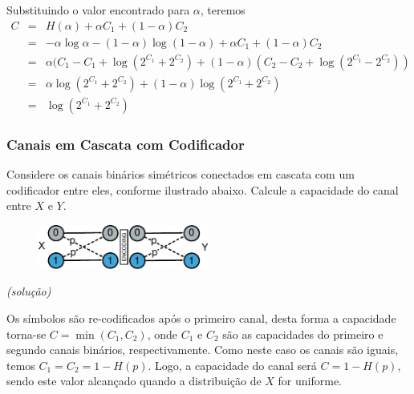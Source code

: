 \begin{frame}[allowframebreaks]
\begin{exercise}
  \exercisebreak
  Substituindo o valor encontrado para $\alpha$, teremos
  \begin{eqnarray}
  C &=& H(\alpha) + \alpha C_1 + (1 - \alpha) C_2 \nonumber \\
	&=& -\alpha \log \alpha - (1 - \alpha) \log (1 - \alpha) + \alpha C_1 + (1 - \alpha) C_2 \nonumber \\
	&=& \alpha (C_1 - C_1 + \log (2^{C_1} + 2^{C_2}) + (1-\alpha)(C_2 - C_2 + \log(2^{C_1}-2^{C_2})) \nonumber \\
	&=& \alpha \log (2^{C_1} + 2^{C_2}) + (1 - \alpha) \log (2^{C_1} + 2^{C_2}) \nonumber \\
	&=& \log (2^{C_1} + 2^{C_2}) 
  \end{eqnarray}   
  \end{exercise}

\end{frame}


\begin{frame}[allowframebreaks]
  \frametitle{Canais em Cascata com Codificador}
  \begin{exercise}

  Considere os canais binários simétricos conectados em cascata com um codificador entre
  eles, conforme ilustrado abaixo. Calcule a capacidade do canal entre $X$ e $Y$.
  \begin{figure}[h!]
  \centering
  \includegraphics[width=0.5\textwidth]{images/c-enc-c.pdf}
  \label{fig:c-enc-c}
  \end{figure}

  \exercisebreak
  \textit{(solução)}

  Os símbolos são re-codificados após o primeiro canal, desta forma a 
  capacidade torna-se $C = \min (C_1, C_2)$, onde $C_1$ e $C_2$ são as
  capacidades do primeiro e segundo canais binários, respectivamente.
  Como neste caso os canais são iguais, temos $C_1 = C_2 = 1 - H(p)$.
  Logo, a capacidade do canal será $C = 1 - H(p)$, sendo este valor alcançado
  quando a distribuição de $X$ for uniforme.
 
  \end{exercise}
\end{frame}


